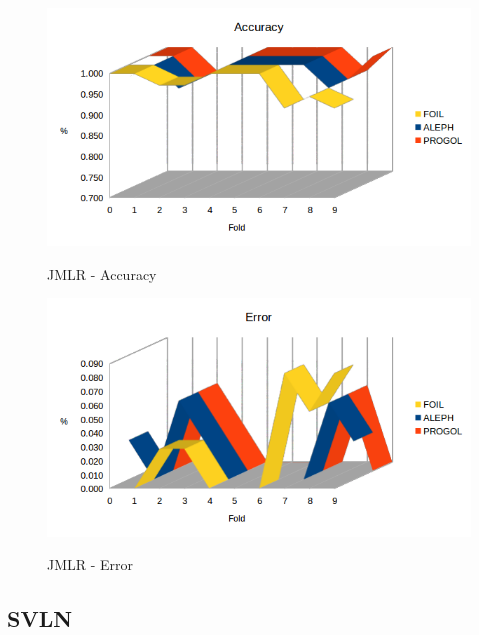 \begin{figure}[H]
	\includegraphics[width=1.1\textwidth]{img/datasetGraph/jmlr/accuracy.png}
	\label{JMLR-Accuracy}
	\caption{JMLR - Accuracy}
\end{figure}

\begin{figure}[H]
	\includegraphics[width=1.1\textwidth]{img/datasetGraph/jmlr/error.png}
	\label{JMLR-Error}
	\caption{JMLR - Error}
\end{figure}

\subsection{SVLN}
